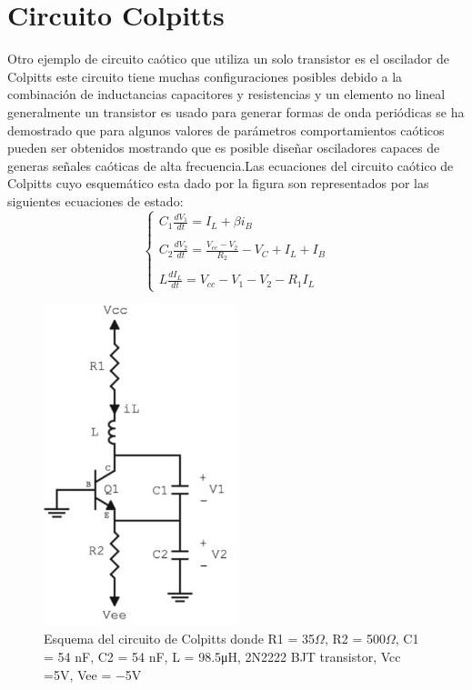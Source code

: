 \documentclass{article}
\begin{document}
\section{Circuito Colpitts}
Otro ejemplo de circuito caótico que utiliza un solo transistor es el oscilador de Colpitts este circuito tiene muchas configuraciones posibles debido a la combinación de inductancias capacitores y resistencias y un elemento no lineal generalmente un transistor es usado para generar formas de onda periódicas se ha demostrado que para algunos valores de parámetros comportamientos caóticos pueden ser obtenidos mostrando que es posible diseñar osciladores capaces de generas señales caóticas de alta frecuencia.Las ecuaciones del circuito caótico de Colpitts cuyo esquemático esta dado por la figura son representados por las siguientes ecuaciones de estado:
\begin{equation}
 \left\lbrace\begin{array}{lcc}
 
  C_{1}\frac{dV_{1}}{dt} = I_{L}+{\beta i_{B}} \\\\  
   C_{2}\frac{dV_{2}}{dt} =\frac{V_{ee}-V_{2}}{R_{2}} -V_{C}+ I_{L}+I_{B} \\\\ 
  L\frac{dI_{L}}{dt} = V_{cc}-V_{1}-V_{2}-R_{1}I_{L}
  \end{array}\right. 
\label{eq:one}
\end{equation}

  \begin{figure}
        \centering
        \includegraphics[width=0.5\textwidth]{Colpitts/cirucito-Colpitts.png}
        \caption{Esquema del circuito de Colpitts donde  R1 = 35$\Omega$,
R2 = 500$\Omega$, C1 = 54 nF,
C2 = 54 nF, L = 98.5μH,
2N2222 BJT transistor, Vcc =5V, Vee = −5V}
        \label{fig:my_label}
    \end{figure}
\end{document}
